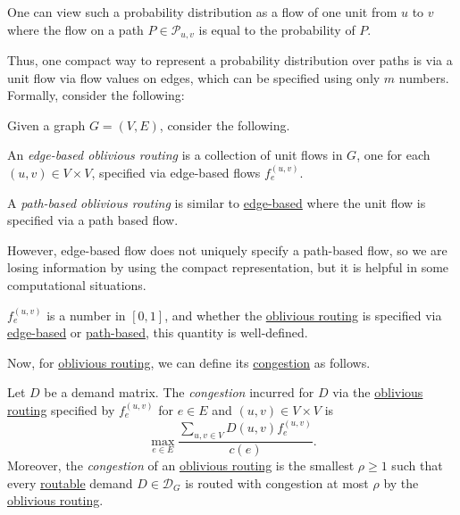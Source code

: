 \begin{intuition}
	One can view such a probability distribution as a flow of one unit from \(u\) to \(v\) where the flow on a path \(P\in \mathcal{P} _{u, v}\) is equal to the probability of \(P\).
\end{intuition}

Thus, one compact way to represent a probability distribution over paths is via a unit flow via flow values on edges, which can be specified using only \(m\) numbers. Formally, consider the following:

\begin{definition}\label{def:oblivious-routing-scheme}
	Given a graph \(G = (V, E)\), consider the following.
	\begin{definition}\label{def:edge-based-oblivious-routing}
		An \emph{edge-based oblivious routing} is a collection of unit flows in \(G\), one for each \((u, v) \in V \times V\), specified via edge-based flows \(f_e^{(u, v)}\).
	\end{definition}

	\begin{definition}\label{def:path-based-oblivious-routing}
		A \emph{path-based oblivious routing} is similar to \hyperref[def:edge-based-oblivious-routing]{edge-based} where the unit flow is specified via a path based flow.
	\end{definition}
\end{definition}

However, edge-based flow does not uniquely specify a path-based flow, so we are losing information by using the compact representation, but it is helpful in some computational situations.

\begin{note}
	\(f_e^{(u, v)}\) is a number in \([0, 1]\), and whether the \hyperref[def:oblivious-routing-scheme]{oblivious routing} is specified via \hyperref[def:edge-based-oblivious-routing]{edge-based} or \hyperref[def:path-based-oblivious-routing]{path-based}, this quantity is well-defined.
\end{note}

Now, for \hyperref[def:oblivious-routing-scheme]{oblivious routing}, we can define its \hyperref[def:congestion]{congestion} as follows.

\begin{definition}\label{def:congestion-of-oblivious-routing}
	Let \(D\) be a demand matrix. The \emph{congestion} incurred for \(D\) via the \hyperref[def:oblivious-routing-scheme]{oblivious routing} specified by \(f_e^{(u, v)}\) for \(e \in E\) and \((u, v) \in V \times V\) is
	\[
		\max _{e \in E} \frac{\sum_{u, v \in V} D(u, v) f_e^{(u, v)}}{c(e)}.
	\]
	Moreover, the \emph{congestion} of an \hyperref[def:oblivious-routing-scheme]{oblivious routing} is the smallest \(\rho \geq 1\) such that every \hyperref[def:routable]{routable} demand \(D \in \mathcal{D} _G\) is routed with congestion at most \(\rho \) by the \hyperref[def:oblivious-routing-scheme]{oblivious routing}.
\end{definition}

